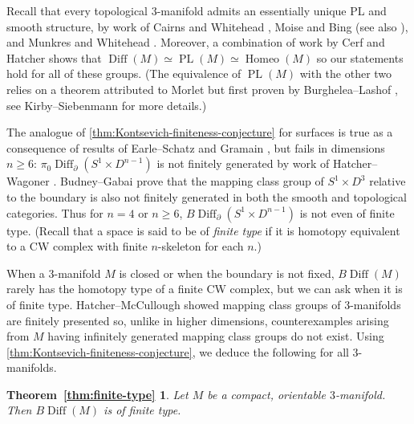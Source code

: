 \documentclass{amsart}
\theoremstyle{plain}
\theoremstyle{definition}
\DeclareMathOperator\Diff{Diff}
\DeclareMathOperator{\PL}{PL}
\newcommand{\BDiff}{B\!\Diff}
\newcommand{\fakeenv}{} %
\newenvironment{restate}[2]  %
{
  \renewcommand{\fakeenv}{#2}   %
  \theoremstyle{plain}
  \newtheorem*{\fakeenv}{#1~\ref{#2}} %
  \begin{\fakeenv}  
}
{ \end{\fakeenv} }
\begin{document}
Recall that every topological 3-manifold admits an essentially unique PL and smooth structure, by work of Cairns \cite{Cairns1940} and Whitehead \cite{Whitehead}, Moise \cite{Moise1952,Moise54} and Bing \cite{Bing54} (see also \cite{Bing59}), and Munkres \cite{Munkres-Announcement,Munkres, Munkres-Obstructions}  and Whitehead \cite{Whitehead61}. Moreover, a combination of work by Cerf \cite{Cerf59} and Hatcher \cite{Hatcher} shows that $\Diff(M) \simeq \PL(M)\simeq \operatorname{Homeo}(M)$ so our statements hold for all of these groups. (The equivalence of $\operatorname{PL}(M)$ with the other two relies on a theorem attributed to Morlet but first proven by Burghelea--Lashof \cite{BurgheleaLashof}, see Kirby--Siebenmann \cite[Essay V]{KirbySiebenmann} for more details.)

The analogue of \cref{thm:Kontsevich-finiteness-conjecture} for surfaces is true as a consequence of results of Earle--Schatz \cite{EarleSchatz} and Gramain \cite{Gramain}, but fails in dimensions $n\geq 6$: 
$\pi_0\Diff_\partial(S^1 \times D^{n-1})$ is not finitely generated by work of Hatcher--Wagoner \cite[$n\geq 7$: Part II, Corollary 5.5, $n=6$: p230]{HatcherWagoner}. 
Budney--Gabai \cite{BudneyGabai2021} prove that the mapping class group of $S^1\times D^{3}$ relative to the boundary is also not finitely generated in both the smooth and topological categories.
Thus for $n=4$ or $n\geq 6$, $\BDiff_\partial(S^1\times D^{n-1})$ is not even of finite type. (Recall that a space is said to be of \emph{finite type} if it is homotopy equivalent to a CW complex with finite $n$-skeleton for each $n$.)

When a 3-manifold $M$ is closed or when the boundary is not fixed, $\BDiff(M)$ rarely has the homotopy type of a finite CW complex, but we can ask when it is of finite type. Hatcher--McCullough showed mapping class groups of 3-manifolds are finitely presented \cite{HatcherMcCullough1990} so, unlike in higher dimensions, counterexamples arising from $M$ having infinitely generated mapping class groups do not exist. Using \cref{thm:Kontsevich-finiteness-conjecture}, we deduce the following for all 3-manifolds.

\begin{restate}{Theorem}{thm:finite-type}
    Let $M$ be a compact, orientable $3$-manifold.
    Then $\BDiff(M)$ is of finite type.
\end{restate}
\end{document}
